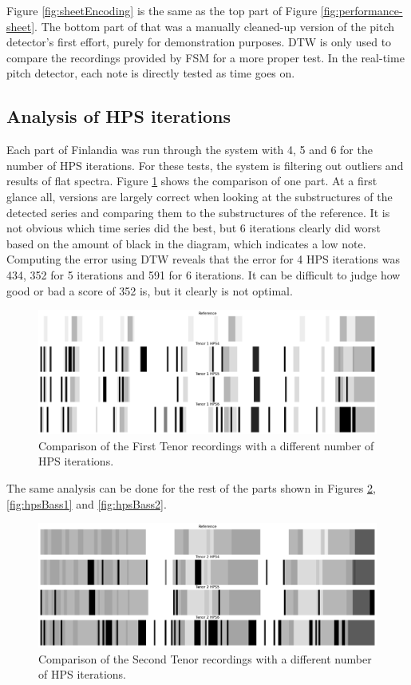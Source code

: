 Figure \ref{fig:sheetEncoding} is the same as the top part of Figure \ref{fig:performance-sheet}. The bottom part of that was a manually cleaned-up version of the pitch detector's first effort, purely for demonstration purposes. DTW is only used to compare the recordings provided by FSM for a more proper test. In the real-time pitch detector, each note is directly tested as time goes on.

\subsection{Analysis of HPS iterations}
Each part of Finlandia was run through the system with 4, 5 and 6 for the number of HPS iterations. For these tests, the system is filtering out outliers and results of flat spectra. Figure \ref{fig:hpsTenor1} shows the comparison of one part. At a first glance all, versions are largely correct when looking at the substructures of the detected series and comparing them to the substructures of the reference. It is not obvious which time series did the best, but 6 iterations clearly did worst based on the amount of black in the diagram, which indicates a low note. Computing the error using DTW reveals that the error for 4 HPS iterations was 434, 352 for 5 iterations and 591 for 6 iterations. It can be difficult to judge how good or bad a score of 352 is, but it clearly is not optimal.

\begin{figure}[ht]
    \centering
    \includegraphics[width=\textwidth]{./images/hpsTenor1.png}
    \caption{Comparison of the First Tenor recordings with a different number of HPS iterations. \label{fig:hpsTenor1}}
\end{figure}

The same analysis can be done for the rest of the parts shown in Figures \ref{fig:hpsTenor2}, \ref{fig:hpsBass1} and \ref{fig:hpsBass2}.

\begin{figure}[ht]
    \centering
    \includegraphics[width=\textwidth]{./images/hpsTenor2.png}
    \caption{Comparison of the Second Tenor recordings with a different number of HPS iterations. \label{fig:hpsTenor2}}
\end{figure}


